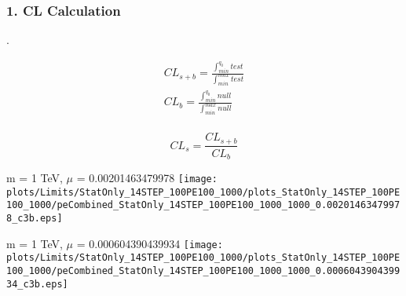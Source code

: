 \begin{frame}
	\frametitle{1. CL Calculation}
		
		\vspace{20pt}
		
		
		\vspace{10pt}
		{}
		\vspace{-5pt}
		
		.

	\vspace{-15pt}
	\begin{center}
	{\footnotesize{
	\begin{minipage}{.5\linewidth}
		\begin{equation*}
			\begin{split}
				CL_{s+b} = \frac{ \int_{min}^{q_{0}} test }{ \int_{min}^{max} test } \\
				CL_{b} = \frac{ \int_{min}^{q_{0}} null }{ \int_{min}^{max} null } \\
		\end{split}
		\end{equation*}	
	\end{minipage}\hfill
	\begin{minipage}{.5\linewidth}
		\begin{equation*}
 			CL_{s} = \frac{CL_{s+b}}{CL_{b}}
  		\end{equation*}
	\end{minipage}
	
	}}
	\end{center}
		
		
	\begin{center}

		\footnotesize{m = 1 TeV, $\mu$ = 0.00201463479978}
		\texttt{[image: plots/Limits/StatOnly\_14STEP\_100PE100\_1000/plots\_StatOnly\_14STEP\_100PE100\_1000/peCombined\_StatOnly\_14STEP\_100PE100\_1000\_1000\_0.00201463479978\_c3b.eps]}	
		
		\footnotesize{m = 1 TeV, $\mu$ = 0.000604390439934}
		\texttt{[image: plots/Limits/StatOnly\_14STEP\_100PE100\_1000/plots\_StatOnly\_14STEP\_100PE100\_1000/peCombined\_StatOnly\_14STEP\_100PE100\_1000\_1000\_0.000604390439934\_c3b.eps]}	
		
	\end{center}
	\cend
	
\end{frame}





